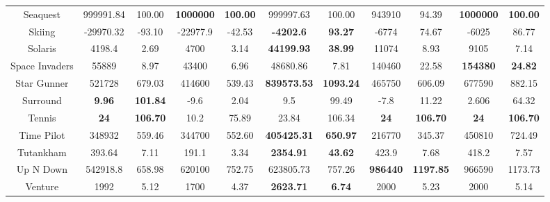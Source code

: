 \documentclass[nohyperref]{article}
\newcommand{\best}[1]{\textbf{#1}}
\theoremstyle{plain}
\begin{document}
\begin{table}[!hb]
\begin{center}
\begin{tabular}{|c| c c| c c| c c| c c| c c| }
 Seaquest           & 999991.84         & 100.00      & \textbf{1000000}& \textbf{100.00}         &999997.63             &100.00         &943910	             &94.39 &\textbf{1000000}  &\textbf{100.00}    \\
 Skiing             & -29970.32         & -93.10      & -22977.9        & -42.53         & \textbf{-4202.6}     &\textbf{93.27}          &-6774             &74.67           &-6025	          &86.77\\
 Solaris            & 4198.4            & 2.69        & 4700            & 3.14           & \textbf{44199.93}    &\textbf{38.99}          &11074             &8.93            &9105            &7.14\\
 Space Invaders     & 55889             & 8.97        & 43400           & 6.96           & 48680.86             &7.81           &140460     &22.58           &\textbf{154380} &\textbf{24.82}\\
 Star Gunner        & 521728            & 679.03      & 414600          & 539.43         &\textbf{839573.53}    &\textbf{1093.24}        &465750            &606.09          &677590          &882.15\\
 Surround           & \textbf{9.96}     & \textbf{101.84}      & -9.6            & 2.04           & 9.5                  &99.49          &-7.8              &11.22           &2.606           &64.32\\
 Tennis             & \textbf{24}       & \textbf{106.70}      & 10.2            & 75.89          & 23.84                &106.34         &\textbf{24}                &\textbf{106.70}          &\textbf{24}              &\textbf{106.70}\\
 Time Pilot         & 348932            & 559.46      & 344700          & 552.60         &\textbf{405425.31}    &\textbf{650.97}         &216770            &345.37          &450810          &724.49\\
 Tutankham          & 393.64            & 7.11        & 191.1           & 3.34           & \textbf{2354.91}     &\textbf{43.62}          &423.9             &7.68            &418.2           &7.57\\
 Up N Down          & 542918.8          & 658.98      & 620100          & 752.75         & 623805.73            &757.26         &\best{986440}     &\textbf{1197.85}         &966590          &1173.73\\
 Venture            & 1992              & 5.12        & 1700            & 4.37           &\textbf{2623.71}      &\textbf{6.74}           &2000              &5.23            &2000            &5.14\\

\end{tabular}
\end{center}
\end{table}
\end{document}
